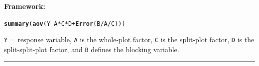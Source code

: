 \documentclass[12pt,english]{article}\usepackage[]{graphicx}\usepackage[table]{xcolor}
\makeatletter
\newcommand{\hlopt}[1]{\textcolor[rgb]{0,0,0}{#1}}%
\newcommand{\hldef}[1]{\textcolor[rgb]{0.345,0.345,0.345}{#1}}%
\newcommand{\hlkwd}[1]{\textcolor[rgb]{0.737,0.353,0.396}{\textbf{#1}}}%
\newenvironment{kframe}{%
 \def\at@end@of@kframe{}%
 \ifinner\ifhmode%
  \def\at@end@of@kframe{\end{minipage}}%
  \begin{minipage}{\columnwidth}%
 \fi\fi%
 \def\FrameCommand##1{\hskip\@totalleftmargin \hskip-\fboxsep
 \colorbox{shadecolor}{##1}\hskip-\fboxsep
     \hskip-\linewidth \hskip-\@totalleftmargin \hskip\columnwidth}%
 \MakeFramed {\advance\hsize-\width
   \@totalleftmargin\z@ \linewidth\hsize
   \@setminipage}}%
 {\par\unskip\endMakeFramed%
 \at@end@of@kframe}
\newenvironment{knitrout}{}{} %
\makeatother
\begin{document}
\begin{tcolorbox}[colback=yellow!50!red!25!white,colbacktitle=yellow!50!red,colframe=black!75!white,title=\textbf{R:} Split-Split-Plot]
\textbf{Framework:}\\
\vspace{-.2in}
\begin{knitrout}
\color{fgcolor}\begin{kframe}
\begin{alltt}
\hlkwd{summary}\hldef{(}\hlkwd{aov}\hldef{(Y} \hlopt{~} \hldef{A} \hlopt{*} \hldef{C} \hlopt{*} \hldef{D} \hlopt{+} \hlkwd{Error}\hldef{(B}\hlopt{/}\hldef{A}\hlopt{/}\hldef{C)))}
\end{alltt}
\end{kframe}
\end{knitrout}
\texttt{Y} = response variable, \texttt{A} is the whole-plot factor, \texttt{C} is the split-plot factor, \texttt{D} is the split-split-plot factor, and \texttt{B} defines the blocking variable.
\vspace{0.1in}
\par\noindent\rule{.9\textwidth}{0.4pt}


\end{tcolorbox}
\end{document}
